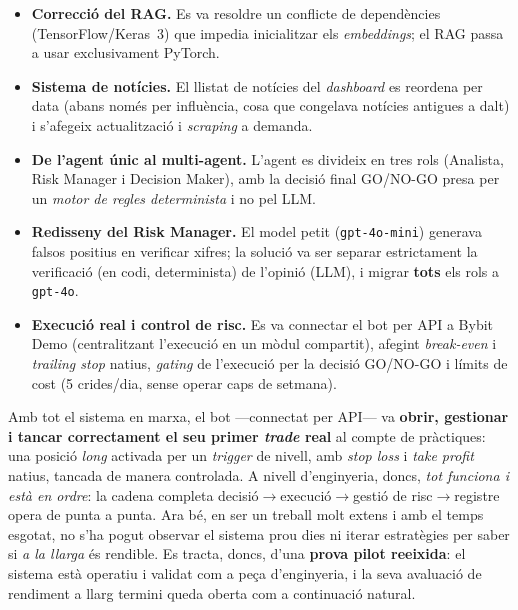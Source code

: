 \documentclass[12pt, a4paper]{report}
\begin{document}
\begin{itemize}[leftmargin=*]
  \item \textbf{Correcció del RAG.} Es va resoldre un conflicte de dependències (TensorFlow/Keras~3) que impedia inicialitzar els \textit{embeddings}; el RAG passa a usar exclusivament PyTorch.
  \item \textbf{Sistema de notícies.} El llistat de notícies del \textit{dashboard} es reordena per data (abans només per influència, cosa que congelava notícies antigues a dalt) i s'afegeix actualització i \textit{scraping} a demanda.
  \item \textbf{De l'agent únic al multi-agent.} L'agent es divideix en tres rols (Analista, Risk Manager i Decision Maker), amb la decisió final GO/NO-GO presa per un \emph{motor de regles determinista} i no pel LLM.
  \item \textbf{Redisseny del Risk Manager.} El model petit (\texttt{gpt-4o-mini}) generava falsos positius en verificar xifres; la solució va ser separar estrictament la verificació (en codi, determinista) de l'opinió (LLM), i migrar \textbf{tots} els rols a \texttt{gpt-4o}.
  \item \textbf{Execució real i control de risc.} Es va connectar el bot per API a Bybit Demo (centralitzant l'execució en un mòdul compartit), afegint \textit{break-even} i \textit{trailing stop} natius, \textit{gating} de l'execució per la decisió GO/NO-GO i límits de cost (5 crides/dia, sense operar caps de setmana).
\end{itemize}

\begin{infobox}
Amb tot el sistema en marxa, el bot ---connectat per API--- va \textbf{obrir, gestionar i tancar correctament el seu primer \textit{trade} real} al compte de pràctiques: una posició \textit{long} activada per un \textit{trigger} de nivell, amb \textit{stop loss} i \textit{take profit} natius, tancada de manera controlada. A nivell d'enginyeria, doncs, \emph{tot funciona i està en ordre}: la cadena completa decisió$\to$execució$\to$gestió de risc$\to$registre opera de punta a punta. Ara bé, en ser un treball molt extens i amb el temps esgotat, no s'ha pogut observar el sistema prou dies ni iterar estratègies per saber si \emph{a la llarga} és rendible. Es tracta, doncs, d'una \textbf{prova pilot reeixida}: el sistema està operatiu i validat com a peça d'enginyeria, i la seva avaluació de rendiment a llarg termini queda oberta com a continuació natural.
\end{infobox}
\end{document}
